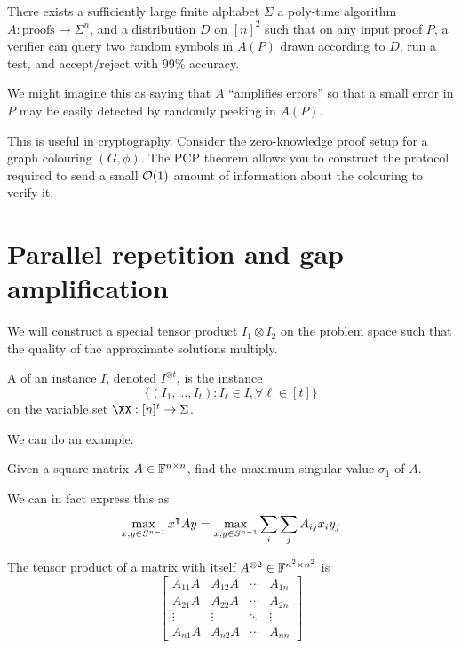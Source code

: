 \documentclass[class=co432,notes,tikz]{agony}
\begin{document}
\begin{theorem}
  There exists a sufficiently large finite alphabet $\Sigma$
  a poly-time algorithm $A : \text{proofs} \to \Sigma^n$,
  and a distribution $D$ on $[n]^2$
  such that on any input proof $P$,
  a verifier can query two random symbols in $A(P)$
  drawn according to $D$, run a test,
  and accept/reject with 99\% accuracy.
\end{theorem}

We might imagine this as saying that $A$ ``amplifies errors''
so that a small error in $P$ may be easily detected by randomly peeking in $A(P)$.

This is useful in cryptography.
Consider the zero-knowledge proof setup for a graph colouring $(G, \phi)$.
The PCP theorem allows you to construct the protocol required
to send a small $\order{1}$ amount of information about the colouring to verify it.

\section{Parallel repetition and gap amplification}

We will construct a special tensor product $I_1 \otimes I_2$
on the problem space such that the quality of the approximate solutions multiply.

\begin{defn}
  A  of an instance $I$,
  denoted $I^{\otimes t}$, is the instance
  \[ \{(I_1,\dotsc,I_t) : I_\ell \in I, \forall \ell \in [t]\} \]
  on the variable set $\XX : [n]^t \to \Sigma$.
\end{defn}

We can do an example.

\begin{problem}
  Given a square matrix $A \in \mathbb{F}^{n\times n}$,
  find the maximum singular value $\sigma_1$ of $A$.
\end{problem}

We can in fact express this as
\[ \max_{x,y \in S^{n-1}} x^{\intercal} A y = \max_{x,y\in S^{n-1}} \sum_i\sum_j A_{ij}x_iy_j \]

\begin{defn}
  The tensor product of a matrix with itself $A^{\otimes 2} \in \mathbb{F}^{n^2 \times n^2}$ is
  \[
    \begin{bmatrix}
      A_{11} A & A_{12} A & \cdots & A_{1n} \\
      A_{21} A & A_{22} A & \cdots & A_{2n} \\
      \vdots   & \vdots   & \ddots & \vdots \\
      A_{n1} A & A_{n2} A & \cdots & A_{nn}
    \end{bmatrix}
  \]
\end{defn}
\end{document}
